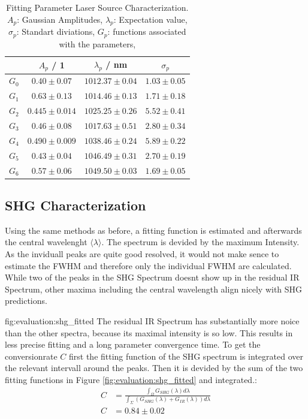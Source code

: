 \begin{table}[H]
\centering
\caption{
    Fitting Parameter Laser Source Characterization. \\
    $A_p$: Gaussian Amplitudes,
    $\lambda_p$: Expectation value,
    $\sigma_p$: Standart diviations,
    $G_p$: functions associated with the parameters,
}
\begin{tabular}{c|ccc} \hline
    &  $A_p$ / 1 &  $\lambda_p$ / nm & $\sigma_p$ \\ \hline  \hline 
$G_0$&$0.40 \pm 0.07$&$1012.37 \pm 0.04$&$1.03 \pm 0.05$\\ \hline
$G_1$&$0.63 \pm 0.13$&$1014.46 \pm 0.13$&$1.71 \pm 0.18$\\ \hline
$G_2$&$0.445 \pm 0.014$&$1025.25 \pm 0.26$&$5.52 \pm 0.41$\\ \hline
$G_3$&$0.46 \pm 0.08$&$1017.63 \pm 0.51$&$2.80 \pm 0.34$\\ \hline
$G_4$&$0.490 \pm 0.009$&$1038.46 \pm 0.24$&$5.89 \pm 0.22$\\ \hline
$G_5$&$0.43 \pm 0.04$&$1046.49 \pm 0.31$&$2.70 \pm 0.19$\\ \hline
$G_6$&$0.57 \pm 0.06$&$1049.50 \pm 0.03$&$1.69 \pm 0.05$\\ \hline
\end{tabular}
\label{tab:evaluation:ir_fitted1}
\end{table}
\newpage
\subsection{SHG Characterization}
Using the same methods as before, a fitting function is estimated and afterwards the central wavelenght $\langle \lambda \rangle$.
The spectrum is devided by the maximum Intensity.
As the inviduall peaks are quite good resolved, it would not make sence to estimate the FWHM and therefore only the individual FWHM are calculated.
While two of the peaks in the SHG Spectrum doesnt show up in the residual IR Spectrum, other maxima including the central wavelength align nicely with SHG predictions.

    {fig:evaluation:shg_fitted}
The residual IR Spectrum has substantially more noice than the other spectra, because its maximal intensity is so low.
This results in less precise fitting and a long parameter convergence time.
To get the conversionrate $C$ first the fitting function of the SHG spectrum is integrated over the relevant intervall around the peaks. 
Then it is devided by the sum of the two fitting functions in Figure \ref{fig:evaluation:shg_fitted} and integrated.:
\begin{align}
    C &= \frac{\int_{\varOmega} G_{SHG}(\lambda) d \lambda}{ \int_{\Sigma} (G_{SHG}(\lambda) + G_{IR}(\lambda))d \lambda} \\
    C &= 0.84 \pm 0.02 
\end{align}

